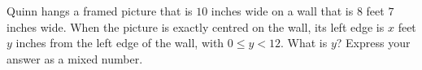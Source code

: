 Quinn hangs a framed picture that is $10$ inches wide on a wall that is $8$ feet $7$ inches wide. When the picture is exactly centred on the wall, its left edge is $x$ feet $y$ inches from the left edge of the wall, with $0\le y<12$. What is $y$? Express your answer as a mixed number.
